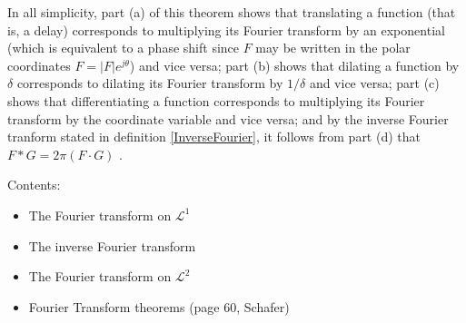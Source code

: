 \noindent
In all simplicity, part (a) of this theorem shows that translating a function (that is, a delay) corresponds to multiplying its Fourier transform by an exponential (which is equivalent to a phase shift since $F$ may be written in the polar coordinates $F = |F|e^{j\theta}$) and vice versa; part (b) shows that dilating a function by $\delta$ corresponds to dilating its Fourier transform by $1/\delta$ and vice versa; part (c) shows that differentiating a function corresponds to multiplying its Fourier transform by the coordinate variable and vice versa; and by the inverse Fourier tranform stated in definition \ref{InverseFourier}, it follows from part (d) that $F*G = 2 \pi (F \cdot G)$ \cite{FAA}.

Contents:
\begin{itemize}
\item The Fourier transform on $\mathcal{L}^1$
\item The inverse Fourier transform
\item The Fourier transform on $\mathcal{L}^2$
\item Fourier Transform theorems (page 60, Schafer)
\end{itemize}